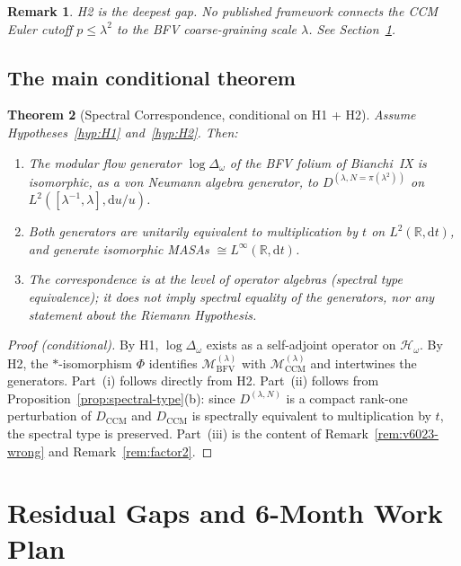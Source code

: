 \documentclass[11pt]{article}
\newtheorem{theorem}{Theorem}[section]
\newtheorem{remark}[theorem]{Remark}
\newcommand{\CCM}{\mathrm{CCM}}
\newcommand{\BFV}{\mathrm{BFV}}
\newcommand{\dd}{\mathrm{d}}
\newcommand{\Lam}{\lambda}
\begin{document}
\begin{remark}
H2 is the deepest gap. No published framework connects the CCM Euler
cutoff $p \le \Lam^2$ to the BFV coarse-graining scale $\Lam$. See
Section~\ref{sec:gaps}.
\end{remark}

\subsection{The main conditional theorem}

\begin{theorem}[Spectral Correspondence, conditional on H1 + H2]
\label{thm:main}
Assume Hypotheses~\ref{hyp:H1} and~\ref{hyp:H2}. Then:
\begin{enumerate}
\item[(i)] The modular flow generator $\log\Delta_\omega$ of the
  BFV folium of Bianchi~IX is isomorphic, as a von Neumann algebra
  generator, to $D^{(\Lam, N=\pi(\Lam^2))}$ on
  $L^2([\Lam^{-1},\Lam],\dd u/u)$.
\item[(ii)] Both generators are unitarily equivalent to multiplication
  by $t$ on $L^2(\mathbb{R},\dd t)$, and generate isomorphic MASAs
  $\cong L^\infty(\mathbb{R},\dd t)$.
\item[(iii)] The correspondence is at the level of operator algebras
  (spectral type equivalence); it does not imply spectral equality of
  the generators, nor any statement about the Riemann Hypothesis.
\end{enumerate}
\end{theorem}

\begin{proof}[Proof (conditional)]
By H1, $\log\Delta_\omega$ exists as a self-adjoint operator on
$\mathcal{H}_\omega$. By H2, the $*$-isomorphism $\Phi$ identifies
$\mathcal{M}_\BFV^{(\Lam)}$ with $\mathcal{M}_\CCM^{(\Lam)}$ and
intertwines the generators. Part~(i) follows directly from H2.
Part~(ii) follows from Proposition~\ref{prop:spectral-type}(b): since
$D^{(\Lam,N)}$ is a compact rank-one perturbation of $D_\CCM$ and
$D_\CCM$ is spectrally equivalent to multiplication by $t$, the
spectral type is preserved. Part~(iii) is the content of
Remark~\ref{rem:v6023-wrong} and Remark~\ref{rem:factor2}.
\end{proof}

\section{Residual Gaps and 6-Month Work Plan}
\label{sec:gaps}
\end{document}
